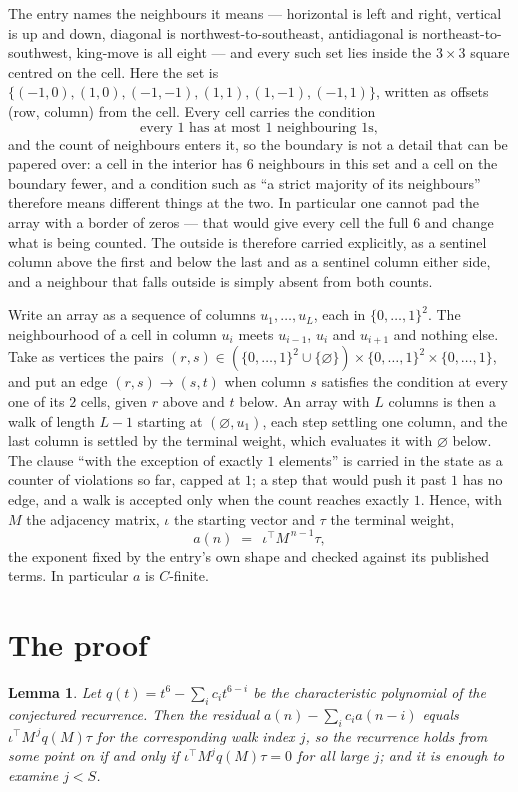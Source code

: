 \documentclass[11pt,a4paper]{article}
\theoremstyle{plain}
\newtheorem{lemma}[theorem]{Lemma}
\theoremstyle{definition}
\begin{document}
The entry names the neighbours it means --- horizontal is left and right, vertical is up and
down, diagonal is northwest-to-southeast, antidiagonal is northeast-to-southwest, king-move is
all eight --- and every such set lies inside the $3\times3$ square centred on the cell. Here
the set is $\{(-1,0), (1,0), (-1,-1), (1,1), (1,-1), (-1,1)\}$, written as offsets (row, column) from the cell. Every cell carries
the condition
\[
\text{every 1 has at most 1 neighbouring 1s},
\]
and the count of neighbours enters it, so the boundary is not a detail that can be papered
over: a cell in the interior has $6$ neighbours in this set and a cell on the boundary
fewer, and a condition such as ``a strict majority of its neighbours'' therefore means
different things at the two. In particular one cannot pad the array with a border of zeros ---
that would give every cell the full $6$ and change what is being counted. The outside is
therefore carried
explicitly, as a sentinel column above the first and below the last and as a sentinel column
either side, and a neighbour that falls outside is simply absent from both counts.

Write an array as a sequence of columns $u_1,\dots,u_L$, each in
$\{0,\dots,1\}^{2}$. The neighbourhood of a cell in column $u_i$ meets $u_{i-1}$,
$u_i$ and $u_{i+1}$ and nothing else. Take as vertices the pairs
$(r,s)\in(\{0,\dots,1\}^{2}\cup\{\varnothing\})\times\{0,\dots,1\}^{2} \times \{0,\dots,1\}$,
and put an edge $(r,s)\to(s,t)$ when column $s$ satisfies the condition at every one of its
$2$ cells, given $r$ above and $t$ below. An array with $L$ columns is then a walk of length
$L-1$ starting at $(\varnothing,u_1)$, each step settling one column, and the last column is
settled by the terminal weight, which evaluates it with $\varnothing$ below. The clause ``with the exception of exactly $1$ elements'' is carried in
the state as a counter of violations so far, capped at $1$; a step that would push it past
$1$ has no edge, and a walk is accepted only when the count reaches exactly $1$. Hence,
with $M$ the adjacency matrix, $\iota$ the starting vector and $\tau$ the terminal weight,
\[
a(n)\;=\;\,\iota^{\!\top}M^{\,n-1}\tau ,
\]
the exponent fixed by the entry's own shape and checked against its published terms. In
particular $a$ is $C$-finite.

\section{The proof}

\begin{lemma}\label{lem:crit}
Let $q(t)=t^{6}-\sum_i c_it^{6-i}$ be the characteristic polynomial of the
conjectured recurrence. Then the residual $a(n)-\sum_ic_ia(n-i)$ equals
$\iota^{\!\top}M^{\,j}q(M)\tau$ for the corresponding walk index $j$, so the
recurrence holds from some point on if and only if $\iota^{\!\top}M^{j}q(M)\tau=0$ for all
large $j$; and it is enough to examine $j<S$.
\end{lemma}
\end{document}
